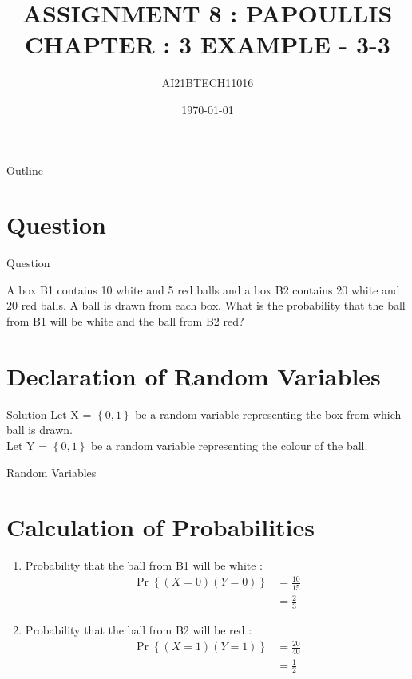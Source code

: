 \documentclass{beamer}
\title{ASSIGNMENT 8 : PAPOULLIS CHAPTER : 3 EXAMPLE - 3-3}
\author{AI21BTECH11016}
\date{\today}
\newcounter{saveenumi}
\newcommand{\seti}{\setcounter{saveenumi}{\value{enumi}}}
\providecommand{\pr}[1]{\ensuremath{\Pr\left\{#1\right\}}}
\providecommand{\brak}[1]{\ensuremath{\left(#1\right)}}
\providecommand{\cbrak}[1]{\ensuremath{\left\{#1\right\}}}
\begin{document}
\begin{frame}
    \titlepage 
\end{frame}

\logo{}

\begin{frame}{Outline}
    \tableofcontents
\end{frame}

\section{Question}
\begin{frame}{Question}
\begin{block}{}
A box B1 contains 10 white and 5 red balls and a box B2 contains 20 white and
20 red balls. A ball is drawn from each box. What is the probability that the ball from
B1 will be white and the ball from B2 red?
\end{block}
\end{frame}

\section{Declaration of Random Variables}
\begin{frame}{Solution}
Let X = \cbrak{0,1} be a random variable representing the box from which ball is drawn.\\
Let Y = \cbrak{0,1} be a random variable representing the colour of the ball.\\

\begin{block}{}
     \begin{table}[ht!]
    \centering
    
    \caption{Random Variables}
    \label{Tab:1}
\end{table}   
    \end{block}
    
\end{frame}

\section{Calculation of Probabilities}
\begin{frame}
\begin{enumerate}
\item{
Probability that the ball from B1 will be white :
\begin{align}
\pr{\brak{X = 0} \brak{Y = 0}} & = \frac{10}{15}\\ & = \frac{2}{3}
\end{align}}

\item{
Probability that the ball from B2 will be red :
\begin{align}
\pr{\brak{X = 1} \brak{Y = 1}} & = \frac{20}{40}\\ & = \frac{1}{2}
\end{align}}
\seti
\end{enumerate}
\end{frame}
\end{document}
